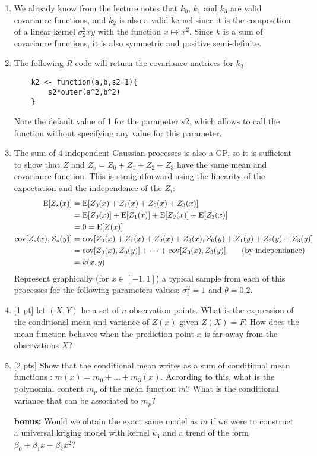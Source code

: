 \documentclass[a4paper,10pt]{article}
\newcommand{\E}{\mbox{E}}
\newcommand{\cov}{\mbox{cov}}
\begin{document}
\begin{enumerate}[label=Q\arabic*.]
\item  We already know from the lecture notes that $k_0$, $k_1$ and $k_3$ are valid covariance functions, and $k_2$ is also a valid kernel since it is the composition of a linear kernel $\sigma_2^2 xy$ with the function $x \mapsto x^2 $. Since $k$ is a sum of covariance functions, it is also symmetric and positive semi-definite.  
\item The following \emph{R} code will return the covariance matrices for $k_2$
\begin{Verbatim}
	k2 <- function(a,b,s2=1){
	    s2*outer(a^2,b^2)
	}
\end{Verbatim}
Note the default value of 1 for the parameter $s2$, which allows to call the function without specifying any value for this parameter.
\item The sum of 4 independent Gaussian processes is also a GP, so it is sufficient to show that $Z$ and $Z_s = Z_0+Z_1+Z_2+Z_3$ have the same mean and covariance function. This is straightforward using the linearity of the expectation and the independence of the $Z_i$:
\begin{align*}
\E [Z_s(x)] &= \E [Z_0(x) + Z_1(x) + Z_2(x) + Z_3(x)] \\
&= \E[Z_0(x)] + \E[Z_1(x)] + \E[Z_2(x)] + \E[Z_3(x)] \\
&= 0 = \E[Z(x)]\\
\cov [Z_s(x),Z_s(y)] &= \cov [ Z_0(x) + Z_1(x) + Z_2(x) + Z_3(x) , Z_0(y) + Z_1(y) + Z_2(y) + Z_3(y)]\\
&= \cov [Z_0(x),Z_0(y)] + \dots + \cov [Z_3(x),Z_3(y)] \text{\qquad (by independance)}\\
&= k(x,y)
\end{align*}
Represent graphically (for $x \in [-1,1]$) a typical sample from each of this processes for the following parameters values: $\sigma_i^2 = 1$ and $\theta = 0.2$.
\item {[1 pt]} let $(X,Y)$ be a set of $n$ observation points. What is the expression of the conditional mean and variance of $Z(x)$ given $Z(X)=F$. How does the mean function behaves when the prediction point $x$ is far away from the observations $X$?
\item {[2 pts]} Show that the conditional mean writes as a sum of conditional mean functions : $m(x) = m_0 + \dots + m_3(x)$. According to this, what is the polynomial content $m_p$ of the mean function $m$? What is the conditional variance that can be associated to $m_p$?
\item[\textbf{bonus:}] Would we obtain the exact same model as $m$ if we were to construct a universal kriging model with kernel $k_3$ and a trend of the form $\beta_0 + \beta_1 x + \beta_2 x^2$?
\end{enumerate}
\end{document}
